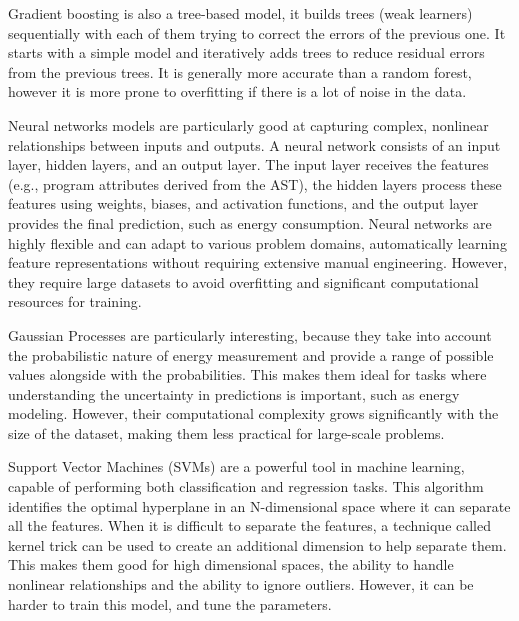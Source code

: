 Gradient boosting is also a tree-based model, it builds trees (weak learners) sequentially with each of them trying to correct the errors of the previous one. It starts with a simple model and iteratively adds trees to reduce residual errors from the previous trees. It is generally more accurate than a random forest, however it is more prone to overfitting if there is a lot of noise in the data.

Neural networks models are particularly good at capturing complex, nonlinear relationships between inputs and outputs. A neural network consists of an input layer, hidden layers, and an output layer. The input layer receives the features (e.g., program attributes derived from the AST), the hidden layers process these features using weights, biases, and activation functions, and the output layer provides the final prediction, such as energy consumption. Neural networks are highly flexible and can adapt to various problem domains, automatically learning feature representations without requiring extensive manual engineering. However, they require large datasets to avoid overfitting and significant computational resources for training.

Gaussian Processes are particularly interesting, because they take into account the probabilistic nature of energy measurement and provide a range of possible values alongside with the probabilities. This makes them ideal for tasks where understanding the uncertainty in predictions is important, such as energy modeling. However, their computational complexity grows significantly with the size of the dataset, making them less practical for large-scale problems.

Support Vector Machines (SVMs) are a powerful tool in machine learning, capable of performing both classification and regression tasks. This algorithm identifies the optimal hyperplane in an N-dimensional space where it can separate all the features. When it is difficult to separate the features, a technique called kernel trick can be used to create an additional dimension to help separate them. This makes them good for high dimensional spaces, the ability to handle nonlinear relationships and the ability to ignore outliers. However, it can be harder to train this model, and tune the parameters.

